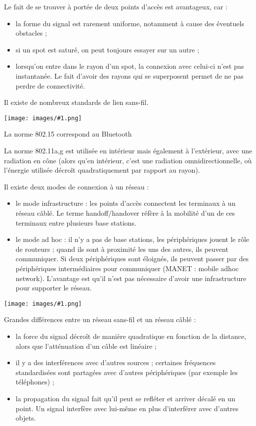 \documentclass[10pt,a4paper]{report}
\newcommand{\dessin}[1]{\begin{center}\texttt{[image: images/\#1.png]}\end{center}}
\begin{document}
	
	Le fait de se trouver à portée de deux points d'accès est avantageux, car :
	
	\begin{itemize}
		\item la forme du signal est rarement uniforme, notamment à cause des éventuels obstacles ;
		\item si un spot est saturé, on peut toujours essayer sur un autre ;
		\item lorsqu'on entre dans le rayon d'un spot, la connexion avec celui-ci n'est pas instantanée. Le fait d'avoir des rayons qui se superposent permet de ne pas perdre de connectivité.
	\end{itemize}
	
	Il existe de nombreux standards de lien sans-fil.
	
	\dessin{27}
	
	La norme 802.15 correspond au Bluetooth
	
	La norme 802.11a,g est utilisée en intérieur mais également à l'extérieur, avec une radiation en cône (alors qu'en intérieur, c'est une radiation omnidirectionnelle, où l'énergie utilisée décroît quadratiquement par rapport au rayon).
	
		
	Il existe deux modes de connexion à un réseau :
	
	\begin{itemize}
		\item le mode infrastructure : les points d'accès connectent les terminaux à un réseau câblé. Le terme handoff/handover réfère à la mobilité d'un de ces terminaux entre plusieurs base stations.
		
		\item le mode ad hoc : il n'y a pas de base stations, les périphériques jouent le rôle de routeurs ; quand ils sont à proximité les uns des autres, ils peuvent communiquer. Si deux périphériques sont éloignés, ils peuvent passer par des périphériques intermédiaires pour communiquer (MANET : mobile adhoc network).
	L'avantage est qu'il n'est pas nécessaire d'avoir une infrastructure pour supporter le réseau.
	\end{itemize}
		
	\dessin{28}
		
		
	Grandes différences entre un réseau sans-fil et un réseau câblé :
	
	\begin{itemize}
		\item la force du signal décroît de manière quadratique en fonction de la distance, alors que l'atténuation d'un câble est linéaire ;
		\item il y a des interférences avec d'autres sources ; certaines fréquences standardisées sont partagées avec d'autres périphériques (par exemple les téléphones) ;
		\item la propagation du signal fait qu'il peut se refléter et arriver décalé en un point. Un signal interfère avec lui-même en plus d'interférer avec d'autres objets.
	\end{itemize}
	
\end{document}
